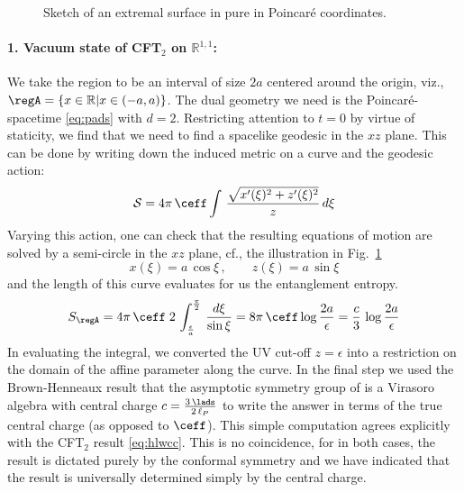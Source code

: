 \documentclass[12pt,openany]{book}
\begin{document}
\begin{figure}[htbp]
\begin{center}
\end{center}
\caption{Sketch of an extremal surface in pure  in Poincar\'e coordinates. }
\label{f:ads3semi}
\end{figure}
%


\paragraph{1. Vacuum state of CFT$_2$ on ${\mathbb R}^{1,1}$:} We take the region to be an interval of size $2a$ centered around the origin, viz.,  $\regA = \{x\in {\mathbb R} | x \in (-a,a)\}$. The dual geometry we need is the Poincar\'e- spacetime \eqref{eq:pads} with $d=2$. Restricting attention to $t=0$ by virtue of staticity, we find that we need to find a spacelike geodesic in the $xz$ plane. This can be done by writing down the induced metric on a curve and the geodesic action:
%
\begin{equation}
{\cal S} = 4\pi\, \ceff \int \, \frac{\sqrt{x'(\xi)^2 + z'(\xi)^2}}{z}\, d\xi
\label{}
\end{equation}
%
Varying this action, one can check that the  resulting equations of  motion are solved by
a semi-circle in the $xz$ plane, cf., the illustration in Fig.~\ref{f:ads3semi}
%
\begin{equation}
x(\xi)  = a\, \cos \xi \,, \qquad z(\xi) = a\, \sin \xi
\end{equation}
%
and the length of this curve evaluates for us the entanglement entropy.
%
\begin{equation}
S_\regA  = 4\pi\, \ceff\; 2\, \int_{\frac{\epsilon}{a}}^\frac{\pi}{2} \, \frac{d\xi}{\sin \xi} = 8\pi \, \ceff\log \frac{2a}{\epsilon} = \frac{c}{3} \,\log\frac{2a}{\epsilon}
\label{eq:hol1cft2}
\end{equation}
%
In evaluating the integral, we converted the UV cut-off $z=\epsilon$ into a restriction on the domain of the affine parameter along the curve. In the final step we used the Brown-Henneaux result \cite{Brown:1986nw} that the asymptotic symmetry group of  is a Virasoro algebra with central charge $c= \frac{3\,\lads}{2\,\ell_P}$ to write the answer in terms of the true central charge (as opposed to $\ceff$). This simple computation agrees explicitly with the CFT$_2$ result  \eqref{eq:hlwcc}. This is no coincidence, for in both cases, the result is dictated purely by the conformal symmetry and we have indicated that the result is universally determined simply by the central charge.
\end{document}
